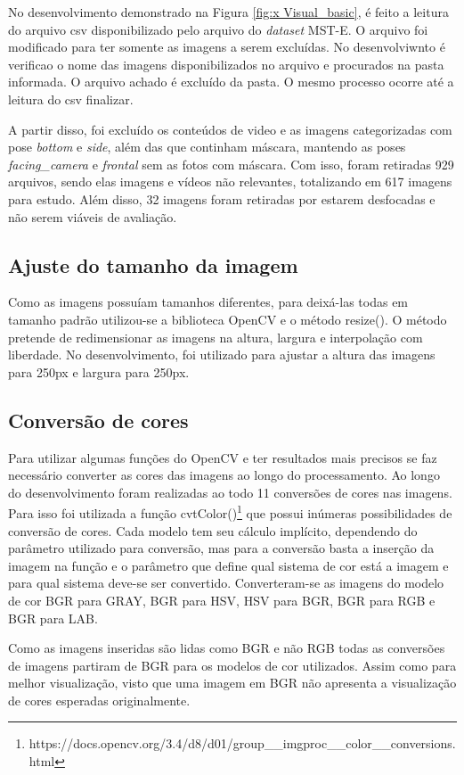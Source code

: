 No desenvolvimento demonstrado na Figura \ref{fig:x Visual_basic}, é feito a leitura do arquivo csv disponibilizado pelo arquivo do \textit{dataset} MST-E. O arquivo foi modificado para ter somente as imagens a serem excluídas. No desenvolviwnto é verificao o nome das imagens disponibilizados no arquivo e procurados na pasta informada. O arquivo achado é excluído da pasta. O mesmo processo ocorre até a leitura do csv finalizar.

A partir disso, foi excluído os conteúdos de video e as imagens categorizadas com pose \textit{bottom} e \textit{side}, além das que continham máscara, mantendo as poses \textit{facing\_camera} e \textit{frontal} sem as fotos com máscara. Com isso, foram retiradas 929 arquivos, sendo elas imagens e vídeos não relevantes, totalizando em 617 imagens para estudo. Além disso, 32 imagens foram retiradas por estarem desfocadas e não serem viáveis de avaliação.

\subsection{Ajuste do tamanho da imagem}
Como as imagens possuíam tamanhos diferentes, para deixá-las todas em tamanho padrão utilizou-se a biblioteca OpenCV e o método resize(). O método pretende de redimensionar as imagens na altura, largura e interpolação com liberdade. No desenvolvimento, foi utilizado para ajustar a altura das imagens para 250px e largura para 250px. 

\subsection{Conversão de cores}
Para utilizar algumas funções do OpenCV e ter resultados mais precisos se faz necessário converter as cores das imagens ao longo do processamento. Ao longo do desenvolvimento foram realizadas ao todo 11 conversões de cores nas imagens. Para isso foi utilizada a função cvtColor()\footnote{https://docs.opencv.org/3.4/d8/d01/group__imgproc__color__conversions.html} que possui inúmeras possibilidades de conversão de cores. Cada modelo tem seu cálculo implícito, dependendo do parâmetro utilizado para conversão, mas para a conversão basta a inserção da imagem na função e o parâmetro que define qual sistema de cor está a imagem e para qual sistema deve-se ser convertido. Converteram-se as imagens do modelo de cor BGR para GRAY, BGR para HSV, HSV para BGR, BGR para RGB e BGR para LAB.

Como as imagens inseridas são lidas como BGR e não RGB todas as conversões de imagens partiram de BGR para os modelos de cor utilizados. Assim como para melhor visualização, visto que uma imagem em BGR não apresenta a visualização de cores esperadas originalmente.

